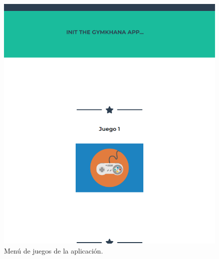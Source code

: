 \documentclass[a4paper, 12pt]{book}
\begin{document}
\begin{figure}
	\centering
	\includegraphics[width=16cm, keepaspectratio]{img/start_html.png}
	\caption{Menú de juegos de la aplicación.}\label{fig:start}
\end{figure}
\end{document}
